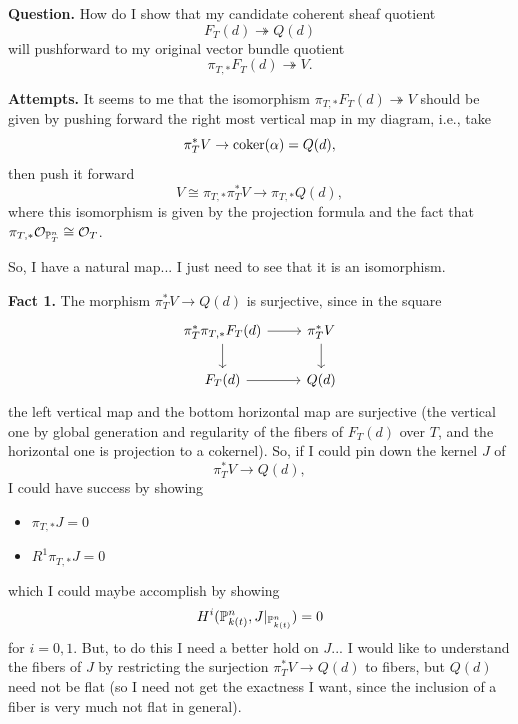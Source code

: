 \documentclass[12pt]{article}
\begin{document}
{\color{red} \textbf{Question.}} How do I show that my candidate coherent sheaf quotient
\[F_T(d) \twoheadrightarrow Q(d)\]
will pushforward to my original vector bundle quotient
\[\pi_{T,*} F_T(d) \twoheadrightarrow V.\]

\textbf{Attempts.} It seems to me that the isomorphism $\pi_{T,*} F_T(d) \twoheadrightarrow V$ should be given by pushing forward the right most vertical map in my diagram, i.e., take
\[\pi_T^* V \to \coker(\alpha)=Q(d),\]
then push it forward
\[V\cong \pi_{T,*} \pi_T^* V \to \pi_{T,*} Q(d),\]
where this isomorphism is given by the projection formula and the fact that $\pi_{T,*} \cO_{\P^n_T} \cong \cO_T$. 

So, I have a natural map... I just need to see that it is an isomorphism.

\textbf{Fact 1.} The morphism $\pi_T^* V \to Q(d)$ is surjective, since in the square
\[\begin{tikzcd}
\pi_T^* \pi_{T,*} F_T(d) \rar \dar & \pi_T^* V \dar\\
F_T(d) \rar & Q(d)
\end{tikzcd}\]
the left vertical map and the bottom horizontal map are surjective (the vertical one by global generation and regularity of the fibers of $F_T(d)$ over $T$, and the horizontal one is projection to a cokernel). So, if I could pin down the kernel $J$ of
\[\pi_T^*V \to Q(d),\]
I could have success by showing
\begin{itemize}
    \item $\pi_{T,*} J = 0$
    \item $R^1 \pi_{T,*} J = 0$
\end{itemize}
which I could maybe accomplish by showing
\[H^i(\P^n_{k(t)},J|_{\P^n_{k(t)}}) = 0\]
for $i=0,1$. But, to do this I need a better hold on $J$... I would like to understand the fibers of $J$ by restricting the surjection $\pi_T^* V \to Q(d)$ to fibers, but $Q(d)$ need not be flat (so I need not get the exactness I want, since the inclusion of a fiber is very much not flat in general).



\end{document}
